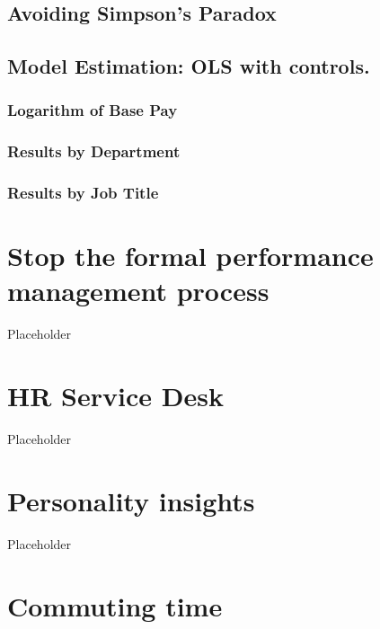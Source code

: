 \documentclass[
  12pt, krantz2,
]{krantz}
\begin{document}
\hypertarget{avoiding-simpsons-paradox}{%
\section{Avoiding Simpson's Paradox}\label{avoiding-simpsons-paradox}}

\hypertarget{model-estimation-ols-with-controls.}{%
\section{Model Estimation: OLS with controls.}\label{model-estimation-ols-with-controls.}}

\hypertarget{logarithm-of-base-pay}{%
\subsection{Logarithm of Base Pay}\label{logarithm-of-base-pay}}

\hypertarget{results-by-department}{%
\subsection{Results by Department}\label{results-by-department}}

\hypertarget{results-by-job-title}{%
\subsection{Results by Job Title}\label{results-by-job-title}}

\hypertarget{stop-appraisals}{%
\chapter{Stop the formal performance management process}\label{stop-appraisals}}

Placeholder

\hypertarget{service-desk}{%
\chapter{HR Service Desk}\label{service-desk}}

Placeholder

\hypertarget{personality}{%
\chapter{Personality insights}\label{personality}}

Placeholder

\hypertarget{commuting-time}{%
\chapter{Commuting time}\label{commuting-time}}
\end{document}
